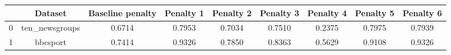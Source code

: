 \begin{tabular}{|l|c|c|c|c|c|c|c|c|}
\hline
 & Dataset & Baseline penalty & Penalty 1 & Penalty 2 & Penalty 3 & Penalty 4 & Penalty 5 & Penalty 6 \\
\hline
0 & ten_newsgroups & 0.6714 & 0.7953 & 0.7034 & 0.7510 & 0.2375 & 0.7975 & 0.7939 \\
1 & bbcsport & 0.7414 & 0.9326 & 0.7850 & 0.8363 & 0.5629 & 0.9108 & 0.9326 \\
\hline
\end{tabular}
